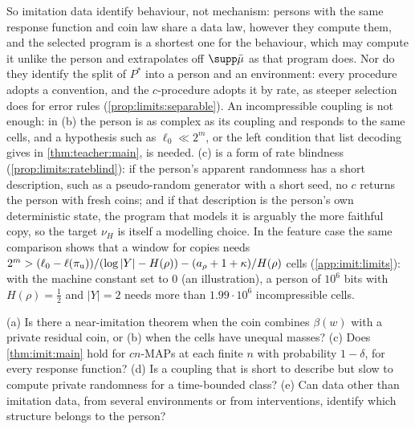 So imitation data identify behaviour, not mechanism: persons with the same response function and coin law share a data law, however they compute them, and the selected program is a shortest one for the behaviour, which may compute it unlike the person and extrapolates off $\supp\bar\mu$ as that program does. Nor do they identify the split of $P^*$ into a person and an environment: every procedure adopts a convention, and the $c$-procedure adopts it by rate, as steeper selection does for error rules (\cref{prop:limits:separable}). An incompressible coupling is not enough: in (b) the person is as complex as its coupling and responds to the same cells, and a hypothesis such as $\ell_0\ll2^m$, or the left condition that list decoding gives in \cref{thm:teacher:main}, is needed. (c) is a form of rate blindness (\cref{prop:limits:rateblind}): if the person's apparent randomness has a short description, such as a pseudo-random generator with a short seed, no $c$ returns the person with fresh coins; and if that description is the person's own deterministic state, the program that models it is arguably the more faithful copy, so the target $\nu_H$ is itself a modelling choice. In the feature case the same comparison shows that a window for copies needs $2^m>(\ell_0-\ell(\pi_{\rm u}))/(\log|Y|-H(\rho))-(a_\rho+1+\kappa)/H(\rho)$ cells (\cref{app:imit:limits}): with the machine constant set to $0$ (an illustration), a person of $10^6$ bits with $H(\rho)=\frac12$ and $|Y|=2$ needs more than $1.99\cdot10^6$ incompressible cells.

\begin{question}[imitation]\label{q:imit:open}
(a) Is there a near-imitation theorem when the coin combines $\beta(w)$ with a private residual coin, or (b) when the cells have unequal masses? (c) Does \cref{thm:imit:main} hold for $cn$-MAPs at each finite $n$ with probability $1-\delta$, for every response function? (d) Is a coupling that is short to describe but slow to compute private randomness for a time-bounded class? (e) Can data other than imitation data, from several environments or from interventions, identify which structure belongs to the person?
\end{question}
